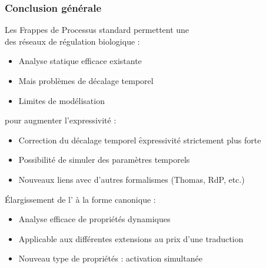 
\begin{frame}[c]
  \frametitle{Conclusion générale}

Les Frappes de Processus standard permettent une \\
des réseaux de régulation biologique :
\begin{itemize}
  \item Analyse statique efficace existante
  \item Mais problèmes de décalage temporel
  \item Limites de modélisation
\end{itemize}

\medskip
{} pour augmenter l'expressivité :
\begin{itemize}
  \item Correction du décalage temporel \f expressivité strictement plus forte
  \item Possibilité de simuler des paramètres temporels
  \item Nouveaux liens avec d'autres formalismes (Thomas, RdP, etc.)
\end{itemize}

\medskip
Élargissement de l' à la forme canonique :
\begin{itemize}
  \item Analyse efficace de propriétés dynamiques
  \item Applicable aux différentes extensions au prix d'une traduction
  \item Nouveau type de propriétés : activation simultanée
\end{itemize}


\end{frame}

